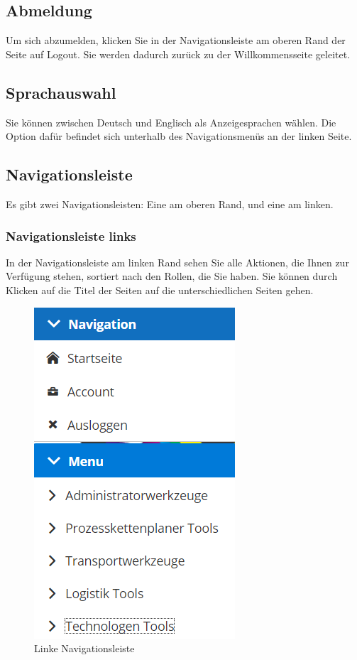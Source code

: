 \documentclass[enabledeprecatedfontcommands,fontsize=12pt,paper=a4,twoside]{scrartcl}
\begin{document}
\subsection{Abmeldung}
Um sich abzumelden, klicken Sie in der Navigationsleiste am oberen Rand der Seite auf Logout. Sie werden dadurch zurück zu der Willkommensseite geleitet. \\


\subsection{Sprachauswahl}
Sie können zwischen Deutsch und Englisch als Anzeigesprachen wählen. Die Option dafür befindet sich unterhalb des Navigationsmenüs an der linken Seite. \\


\subsection{Navigationsleiste}
Es gibt zwei Navigationsleisten: Eine am oberen Rand, und eine am linken. \\


\subsubsection{Navigationsleiste links}
In der Navigationsleiste am linken Rand sehen Sie alle Aktionen, die Ihnen zur Verfügung stehen, sortiert nach den Rollen, die Sie haben. Sie können durch Klicken auf die Titel der Seiten auf die unterschiedlichen Seiten gehen. \\

\begin{figure}[h!]
\begin{center}
 \includegraphics[scale=0.6]{screenshots/allgemein/navigationlinks.png}
  \caption{Linke Navigationsleiste}
  \label{fig:boat1}
\end{center}
\end{figure}
\end{document}
